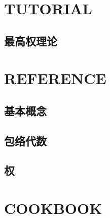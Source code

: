 \documentclass[12pt]{book}
\begin{document}
\part{TUTORIAL}
\chapter{最高权理论}



\part{REFERENCE}

\chapter{基本概念}


\chapter{包络代数}


\chapter{权}

\part{COOKBOOK}
\end{document}
